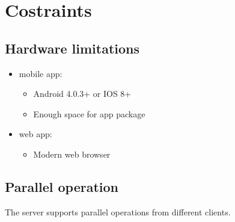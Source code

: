 \section{Costraints}

\subsection{Hardware limitations}
\begin{itemize}
	\item mobile app:
	\begin{itemize}
		\item Android 4.0.3+ or IOS 8+
		\item Enough space for app package
	\end{itemize}
	\item web app:
	\begin{itemize}
		\item Modern web browser
	\end{itemize}
\end{itemize}

\subsection{Parallel operation}
The server supports parallel operations from different clients.